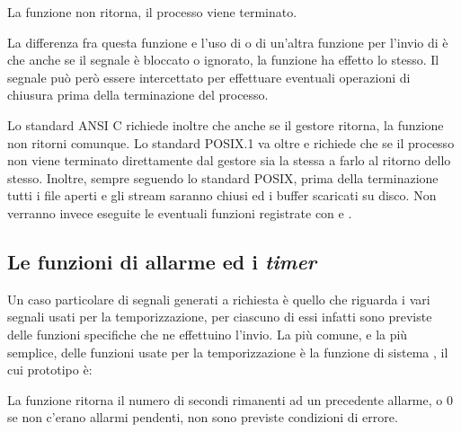 \begin{funcproto}{
}

{La funzione non ritorna, il processo viene terminato.}
\end{funcproto}

La differenza fra questa funzione e l'uso di  o di un'altra
funzione per l'invio di  è che anche se il segnale è bloccato
o ignorato, la funzione ha effetto lo stesso. Il segnale può però essere
intercettato per effettuare eventuali operazioni di chiusura prima della
terminazione del processo.

Lo standard ANSI C richiede inoltre che anche se il gestore ritorna, la
funzione non ritorni comunque. Lo standard POSIX.1 va oltre e richiede che se
il processo non viene terminato direttamente dal gestore sia la stessa
 a farlo al ritorno dello stesso. Inoltre, sempre seguendo lo
standard POSIX, prima della terminazione tutti i file aperti e gli stream
saranno chiusi ed i buffer scaricati su disco. Non verranno invece eseguite le
eventuali funzioni registrate con  e .



\subsection{Le funzioni di allarme ed i \textit{timer}}
\label{sec:sig_alarm_abort}

Un caso particolare di segnali generati a richiesta è quello che riguarda i
vari segnali usati per la temporizzazione, per ciascuno di essi infatti sono
previste delle funzioni specifiche che ne effettuino l'invio. La più comune, e
la più semplice, delle funzioni usate per la temporizzazione è la funzione di
sistema , il cui prototipo è:

\begin{funcproto}{
}

{La funzione ritorna il numero di secondi rimanenti ad un precedente allarme,
  o $0$ se non c'erano allarmi pendenti, non sono previste condizioni di
  errore.}
\end{funcproto}


